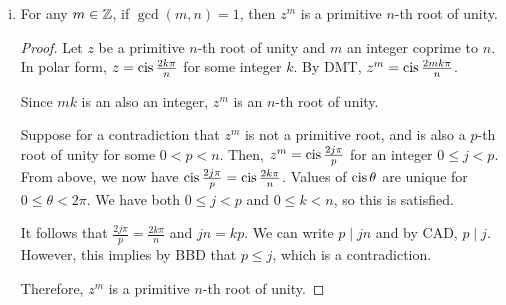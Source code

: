 \begin{enumerate}[(a)]
\begin{enumerate}[i.]
\begin{proof}
                  If $r=0$, then $j = qn$ and $j \mid n$.
                  Otherwise, we have $1 \leq r \leq n-1$ and $z^r = 1$, which is a contradiction
                  to the fact that $z$ is a primitive $n$-th root of unity.

                  Therefore, $r = 0$ and $j \mid n$.

                  ($\Larr$) If $n \mid j$ and $j = nk$ for an integer $k$,
                  then $z^j = z^{nk} = (z^n)^k = 1^k = 1$.
                \end{proof}
          \item For any $m\in\mathbb{Z}$, if $\gcd(m,n)=1$, then $z^m$ is a primitive $n$-th root of unity.
                \begin{proof}
                  Let $z$ be a primitive $n$-th root of unity and $m$ an integer coprime to $n$.
                  In polar form, $z = \operatorname{cis} \frac{2k\pi}{n}$ for some integer $k$.
                  By DMT, $z^m = \operatorname{cis} \frac{2mk\pi}{n}$.

                  Since $mk$ is an also an integer, $z^m$ is an $n$-th root of unity.

                  Suppose for a contradiction that $z^m$ is not a primitive root,
                  and is also a $p$-th root of unity for some $0 < p < n$.
                  Then, $z^m = \operatorname{cis} \frac{2j\pi}{p}$ for an integer $0 \leq j < p$.
                  From above, we now have $\operatorname{cis}\frac{2j\pi}{p} = \operatorname{cis}\frac{2k\pi}{n}$.
                  Values of $\operatorname{cis} \theta$ are unique for $0 \leq \theta < 2\pi$.
                  We have both $0 \leq j < p$ and $0 \leq k < n$, so this is satisfied.

                  It follows that $\frac{2j\pi}{p} = \frac{2k\pi}{n}$ and $jn = kp$.
                  We can write $p \mid jn$ and by CAD, $p \mid j$.
                  However, this implies by BBD that $p \leq j$, which is a contradiction.

                  Therefore, $z^m$ is a primitive $n$-th root of unity.
                \end{proof}
        \end{enumerate}
\end{enumerate}


